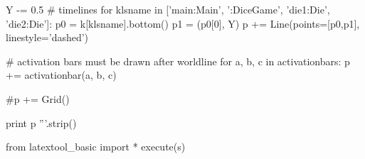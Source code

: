 \begin{python}
Y -= 0.5
# timelines
for klsname in ['main:Main', ':DiceGame', 'die1:Die', 'die2:Die']:
    p0 = k[klsname].bottom()
    p1 = (p0[0], Y)
    p += Line(points=[p0,p1], linestyle='dashed')

# activation bars must be drawn after worldline
for a, b, c in activationbars:
    p += activationbar(a, b, c)
    
#p += Grid()

print p
'''.strip()

from latextool_basic import *
execute(s)
\end{python}
